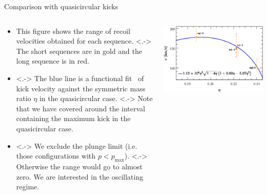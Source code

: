 \documentclass[smaller,aspectratio=169]{beamer}
\begin{document}
\begin{frame}{Comparison with quasicircular kicks}
    \begin{columns}
        \begin{column}{0.5\textwidth}
            \begin{itemize}
                \item<+->
                    This figure shows the \alert{range} of recoil velocities 
                    obtained
                    for each sequence.
                \note[item]<.->{
                    The short sequences are in gold and the long sequence is
                    in red.}
                \item<.->
                    The blue line is a \alert{functional fit}\footnotemark~  
                    of kick velocity against the symmetric mass ratio $\eta$ in 
                    the \alert{quasicircular} case.
                \note[item]<.->{
                    Note that we have covered around the interval containing the
                    maximum kick in the quasicircular case.}
                \item<.->
                    We exclude the plunge limit (i.e. those configurations with
                    $p<p_{\max}$).
                \note[item]<.->{
                    Otherwise the range would go to almost zero. We are
                    interested in the oscillating regime.}
            \end{itemize}
        \end{column}
        \begin{column}{0.5\textwidth}
            \centering
            \includegraphics[width=\columnwidth]{quasicircular-fit2.eps}
        \end{column}
    \end{columns}
\end{frame}
\end{document}
